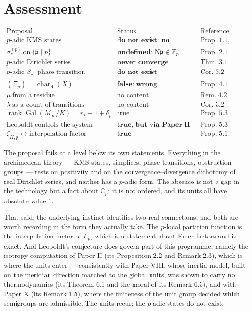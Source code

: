 \documentclass[11pt]{amsart}
\numberwithin{equation}{section}
\theoremstyle{definition}
\theoremstyle{remark}
\newcommand{\Z}{\mathbb{Z}}
\newcommand{\Cp}{\mathbb{C}_p}
\newcommand{\pp}{\mathfrak{p}}
\newcommand{\Ns}{\mathrm{N}}
\newcommand{\Gal}{\operatorname{Gal}}
\newcommand{\rank}{\operatorname{rank}}
\newcommand{\chr}{\operatorname{char}}
\begin{document}
\section{Assessment}

\[
\begin{array}{lll}
\text{Proposal} & \text{Status} & \text{Reference}\\\hline
p\text{-adic KMS states} & \textbf{do not exist: no positivity} & \text{Prop.~1.1, Cor.~1.2}\\
\sigma^{(p)}_z\ \text{on}\ \{\pp\mid p\} & \textbf{undefined: }\Ns\pp\notin\Z_p^\times & \text{Prop.~2.1}\\
p\text{-adic Dirichlet series} & \textbf{never converge} & \text{Thm.~3.1}\\
p\text{-adic }\beta_c,\ \text{phase transition} & \textbf{do not exist} & \text{Cor.~3.2}\\
(\Xi_p)=\chr_\Lambda(X) & \textbf{false: wrong dependence} & \text{Prop.~4.1}\\
\mu\ \text{from a residue} & \text{no content} & \text{Rem.~4.2}\\
\lambda\ \text{as a count of transitions} & \text{no content} & \text{Cor.~3.2}\\
\rank\Gal(M_\infty/K)=r_2+1+\delta_p & \text{true} & \text{Prop.~5.3}\\[-1pt]
\text{Leopoldt controls the system} & \textbf{true, but via Paper II} & \text{Prop.~5.3}\\
\zeta_{K,p}\leftrightarrow\text{interpolation factor} & \textbf{true} & \text{Prop.~5.1}
\end{array}
\]

The proposal fails at a level below its own statements. Everything in the archimedean theory
--- KMS states, simplices, phase transitions, obstruction groups --- rests on positivity and
on the convergence--divergence dichotomy of real Dirichlet series, and neither has a $p$-adic
form. The absence is not a gap in the technology but a fact about $\Cp$: it is not ordered,
and its units all have absolute value $1$.

That said, the underlying instinct identifies two real connections, and both are worth
recording in the form they actually take. The $p$-local partition function is the
interpolation factor of $L_p$, which is a statement about Euler factors and is exact.
And Leopoldt's conjecture does govern part of this programme, namely the isotropy computation
of Paper II (its Proposition 2.2 and Remark 2.3), which is where the units enter --- consistently with
Paper VIII, whose inertia model, built on the meridian direction matched to the global
units, was shown to carry no thermodynamics (its Theorem 6.1 and the moral of its
Remark 6.3), and with Paper X (its Remark 1.5), where the finiteness of the unit group
decided which semigroups are admissible. The units recur; the $p$-adic states do not exist.
\end{document}
